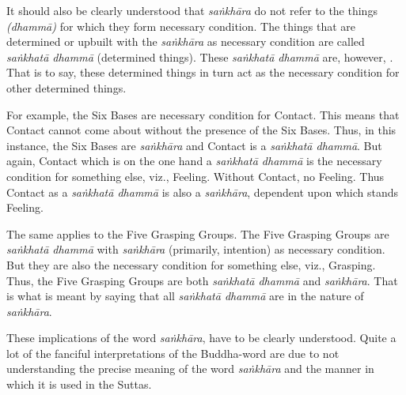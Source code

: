 It should also be clearly understood that \emph{saṅkhāra} do not refer to the things \emph{(dhammā)} for which they form necessary condition. The things that are determined or upbuilt with the \emph{saṅkhāra} as necessary condition are called \emph{saṅkhatā dhammā} (determined things). These \emph{saṅkhatā dhammā} are, however, . That is to say, these determined things in turn act as the necessary condition for other determined things.

For example, the Six Bases are necessary condition for Contact. This means that Contact cannot come about without the presence of the Six Bases. Thus, in this instance, the Six Bases are \emph{saṅkhāra} and Contact is a \emph{saṅkhatā dhammā}. But again, Contact which is on the one hand a \emph{saṅkhatā dhammā} is the necessary condition for something else, viz., Feeling. Without Contact, no Feeling. Thus Contact as a \emph{saṅkhatā dhammā} is also a \emph{saṅkhāra}, dependent upon which stands Feeling.

The same applies to the Five Grasping Groups. The Five Grasping Groups are \emph{saṅkhatā dhammā} with \emph{saṅkhāra} (primarily, intention) as necessary condition. But they are also the necessary condition for something else, viz., Grasping. Thus, the Five Grasping Groups are both \emph{saṅkhatā dhammā} and \emph{saṅkhāra}. That is what is meant by saying that all \emph{saṅkhatā dhammā} are in the nature of \emph{saṅkhāra}.

These implications of the word \emph{saṅkhāra}, have to be clearly understood. Quite a lot of the fanciful interpretations of the Buddha-word are due to not understanding the precise meaning of the word \emph{saṅkhāra} and the manner in which it is used in the Suttas.
